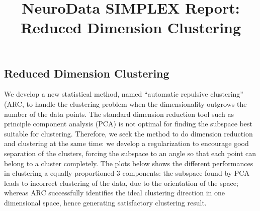 \documentclass[simplex.tex]{subfiles}
\title{NeuroData SIMPLEX Report: Reduced Dimension Clustering}
\begin{document}

\subsection{Reduced Dimension Clustering}

We develop a new statistical method, named ``automatic repulsive
clustering'' (ARC, to handle the clustering problem when the
dimensionality outgrows the number of the data points. The standard
dimension reduction tool such as principle component analysis (PCA) is
not optimal for finding the subspace best suitable for clustering.
Therefore, we seek the method to do dimension reduction and clustering
at the same time: we develop a regularization to encourage good
separation of the clusters, forcing the subspace to an angle so that
each point can belong to a cluster completely. The plots below shows the
different performances in clustering a equally proportioned 3
components: the subspace found by PCA leads to incorrect clustering of
the data, due to the orientation of the space; whereas ARC successfully
identifies the ideal clustering direction in one dimensional space,
hence generating satisfactory clustering result.
\end{document}

